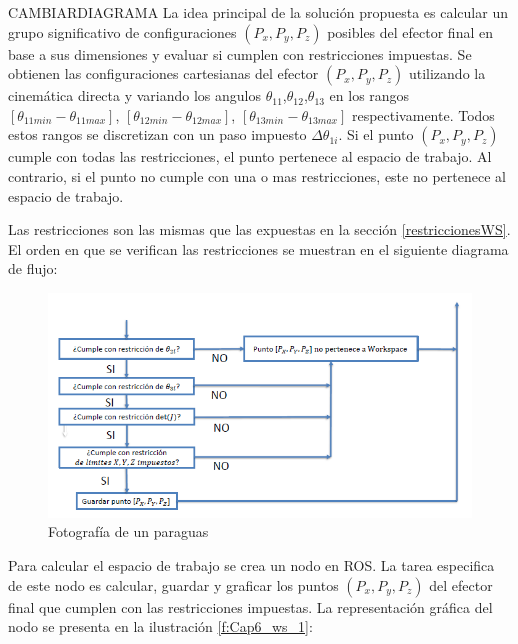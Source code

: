     CAMBIARDIAGRAMA La idea principal de la solución propuesta es calcular un grupo significativo de configuraciones $(P_x,P_y,P_z)$ posibles del efector final en base a sus dimensiones y evaluar si cumplen con restricciones impuestas. Se obtienen las configuraciones cartesianas del efector $(P_x,P_y,P_z)$  utilizando la cinemática directa y variando los angulos $\theta_{11}$,$\theta_{12}$,$\theta_{13}$ en los rangos $[\theta_{11min}-\theta_{11max}]$, $[\theta_{12min}-\theta_{12max}]$, $[\theta_{13min}-\theta_{13max}]$ respectivamente. Todos estos rangos se discretizan con un paso impuesto \(  \Delta  \theta _{1i} \). Si el punto  $(P_x,P_y,P_z)$ cumple con todas las restricciones, el punto pertenece al espacio de trabajo. Al contrario, si el punto no cumple con una o mas restricciones, este no pertenece al espacio de trabajo.

        \newpage

    Las restricciones son las mismas que las expuestas en la sección \ref{restriccionesWS}. El orden en que se verifican las restricciones se muestran en el siguiente diagrama de flujo:

             \begin{figure}[htb]
                \centering
                \includegraphics[width=1\linewidth]{Main/Chapter6/Images6/cap6_ws_3.png}
                \caption{Fotografía de un paraguas}
                \label{f:Cap6_ws_3}
            \end{figure}  


    Para calcular el espacio de trabajo se crea un nodo en ROS. La tarea especifica de este nodo es calcular, guardar y graficar los puntos $(P_x,P_y,P_z)$ del efector final que cumplen con las restricciones impuestas. 
    La representación gráfica del nodo se presenta en la ilustración \ref{f:Cap6_ws_1}: 
    
